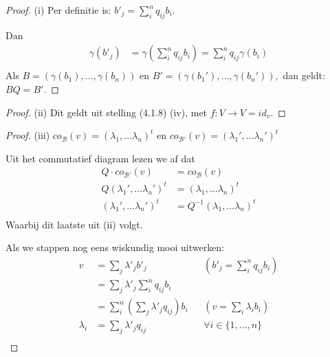 \begin{proof}(i)
    Per definitie is: \(b'_j = \sum_i^n q_{ij}b_i\).

    Dan
    \begin{align*}
        \gamma (b'_j)
        &=  \gamma(\sum_i^n q_{ij}b_i)
        =  \sum_i^n q_{ij}\gamma(b_i)\\
    \end{align*}
    Als
       \( B = (\gamma(b_1),
       \dots, \gamma(b_n)) \text{ en } B' = (\gamma(b_1'), \dots, \gamma(b_n')),\)
       dan geldt: \(B Q = B'\).
\end{proof}
\begin{proof}(ii)
    Dit geldt uit stelling (4.1.8) (iv), met \(f:V\to V = id_v\).
\end{proof}
\begin{proof}(iii)
     \(co_{\mathcal{B}}(v) = (\lambda_1,\dots\lambda_n)^t\)
    en
    \(co_{\mathcal{B'}}(v) = (\lambda_1',\dots\lambda_n')^t\)

    Uit het commutatief diagram lezen we af dat
    \begin{align*}
        Q \cdot co_{\mathcal{B'}}(v) &= co_{\mathcal{B}}(v)\\
        Q (\lambda_1',\dots\lambda_n')^t &= (\lambda_1,\dots\lambda_n)^t\\
         (\lambda_1',\dots\lambda_n')^t &= Q^{-1} (\lambda_1,\dots\lambda_n)^t\\
    \end{align*}
    Waarbij dit laatste uit (ii) volgt.

    Als we stappen nog eens wiskundig mooi uitwerken:
    \begin{align*}
        v &= \sum_j \lambda'_j b'_j && (b'_j = \sum_i^n q_{ij}b_i) \\
        &= \sum_j \lambda'_j \sum_i^n q_{ij}b_i \\
         &= \sum_i^n \left(\sum_j \lambda'_j q_{ij}\right)b_i && (v = \sum_i\lambda_ib_i)\\
          \lambda_i &=  \sum_j \lambda'_j q_{ij} && \forall i \in \{1,\dots,n\}\\
    \end{align*}


\end{proof}

